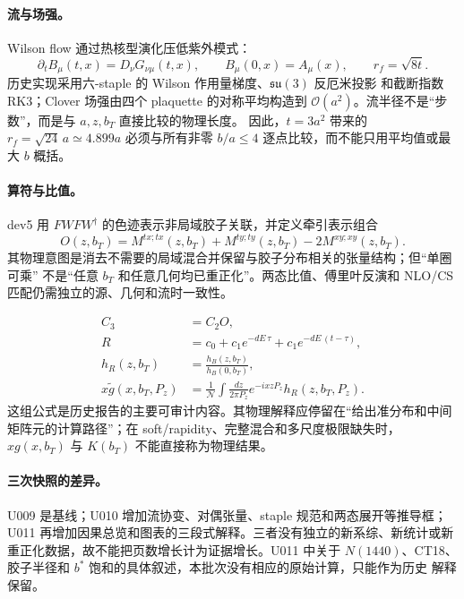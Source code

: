 \paragraph{流与场强。}
Wilson flow 通过热核型演化压低紫外模式：
\begin{equation}
  \partial_t B_\mu(t,x)=D_\nu G_{\nu\mu}(t,x),
  \qquad B_\mu(0,x)=A_\mu(x),
  \qquad r_f=\sqrt{8t}.
  \label{eq:b08-flow}
\end{equation}
历史实现采用六-staple 的 Wilson 作用量梯度、\(\mathfrak{su}(3)\) 反厄米投影
和截断指数 RK3；Clover 场强由四个 plaquette 的对称平均构造到
\(\mathcal O(a^2)\)。流半径不是“步数”，而是与 \(a,z,b_T\) 直接比较的物理长度。
因此，\(t=3a^2\) 带来的 \(r_f=\sqrt{24}\,a\simeq4.899a\) 必须与所有非零
\(b/a\le4\) 逐点比较，而不能只用平均值或最大 \(b\) 概括。

\paragraph{算符与比值。}
dev5 用 \(F W F W^\dagger\) 的色迹表示非局域胶子关联，并定义牵引表示组合
\begin{equation}
  O(z,b_T)=M^{tx;tx}(z,b_T)+M^{ty;ty}(z,b_T)-2M^{xy;xy}(z,b_T).
  \label{eq:b08-operator}
\end{equation}
其物理意图是消去不需要的局域混合并保留与胶子分布相关的张量结构；但“单圈可乘”
不是“任意 \(b_T\) 和任意几何均已重正化”。两态比值、傅里叶反演和 NLO/CS
匹配仍需独立的源、几何和流时一致性。

\begin{equation}
  \begin{aligned}
    C_3&=C_2O,\\
    R&=c_0+c_1e^{-dE\,\tau}+c_1e^{-dE\,(t-\tau)},\\
    h_R(z,b_T)&=\frac{h_B(z,b_T)}{h_B(0,b_T)},\\
    x\tilde g(x,b_T,P_z)&=\frac{1}{\mathcal N}
      \int\frac{dz}{2\pi P_z}e^{-ixzP_z}h_R(z,b_T,P_z).
  \end{aligned}
  \label{eq:b08-dev5-chain}
\end{equation}
这组公式是历史报告的主要可审计内容。其物理解释应停留在“给出准分布和中间
矩阵元的计算路径”；在 soft/rapidity、完整混合和多尺度极限缺失时，
\(xg(x,b_T)\) 与 \(K(b_T)\) 不能直接称为物理结果。

\paragraph{三次快照的差异。}
U009 是基线；U010 增加流协变、对偶张量、staple 规范和两态展开等推导框；
U011 再增加因果总览和图表的三段式解释。三者没有独立的新系综、新统计或新
重正化数据，故不能把页数增长计为证据增长。U011 中关于 \(N(1440)\)、CT18、
胶子半径和 \(b^*\) 饱和的具体叙述，本批次没有相应的原始计算，只能作为历史
解释保留。

